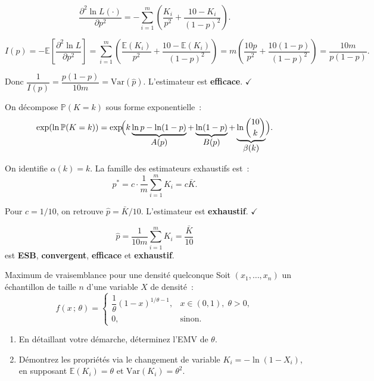 \documentclass[11pt,a4paper]{article}
\newcommand{\E}{\mathbb{E}}
\newcommand{\Var}{\mathrm{Var}}
\newcommand{\Prob}{\mathbb{P}}
\renewcommand{\P}{\Prob}
\begin{document}
\begin{demobox}
$$\frac{\partial^2\ln L(\cdot)}{\partial p^2}
  = -\sum_{i=1}^m\!\left(\frac{K_i}{p^2}+\frac{10-K_i}{(1-p)^2}\right).$$

$$I(p) = -\E\!\left[\frac{\partial^2\ln L}{\partial p^2}\right]
  = \sum_{i=1}^m\!\left(\frac{\E(K_i)}{p^2}+\frac{10-\E(K_i)}{(1-p)^2}\right)
  = m\!\left(\frac{10p}{p^2}+\frac{10(1-p)}{(1-p)^2}\right) = \frac{10m}{p(1-p)}.$$

Donc $\dfrac{1}{I(p)} = \dfrac{p(1-p)}{10m} = \Var(\hat p)$. L'estimateur est \textbf{efficace}. $\checkmark$
\end{demobox}

\begin{demobox}[(d) Exhaustivit\'e]
On d\'ecompose $\P(K=k)$ sous forme exponentielle~:
$$\exp(\ln\P(K=k)) = \exp\!\Bigl(k\underbrace{\ln p-\ln(1-p)}_{\displaystyle A(p)} + \underbrace{\ln(1-p)}_{\displaystyle B(p)} + \underbrace{\ln\binom{10}{k}}_{\displaystyle\beta(k)}\Bigr).$$

On identifie $\alpha(k) = k$. La famille des estimateurs exhaustifs est~:
$$p^* = c\cdot\frac{1}{m}\sum_{i=1}^m K_i = c\bar K.$$

Pour $c=1/10$, on retrouve $\hat p = \bar K/10$. L'estimateur est \textbf{exhaustif}. $\checkmark$
\end{demobox}

\begin{methbox}
$$\boxed{\hat p = \frac{1}{10m}\sum_{i=1}^m K_i = \frac{\bar K}{10}}$$
est \textbf{ESB}, \textbf{convergent}, \textbf{efficace} et \textbf{exhaustif}.
\end{methbox}

\begin{exercice}{Maximum de vraisemblance pour une densit\'e quelconque}
Soit $(x_1,\ldots,x_n)$ un \'echantillon de taille $n$ d'une variable $X$ de densit\'e~:
$$f(x\,;\,\theta) =
\begin{cases}
\dfrac{1}{\theta}(1-x)^{1/\theta - 1}, & x\in(0,1),\;\theta>0,\\[6pt]
0, & \text{sinon.}
\end{cases}$$

\begin{enumerate}[label=\textbf{\arabic*)}]
  \item En d\'etaillant votre d\'emarche, d\'eterminez l'EMV de $\theta$.
  \item D\'emontrez les propri\'et\'es via le changement de variable $K_i=-\ln(1-X_i)$, en supposant $\E(K_i)=\theta$ et $\Var(K_i)=\theta^2$.
\end{enumerate}
\end{exercice}
\end{document}
